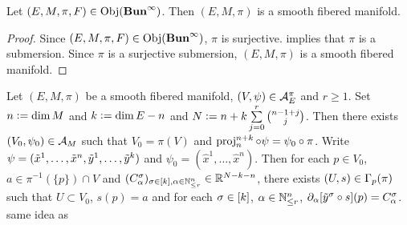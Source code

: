 \documentclass{book}
\begin{document}
\begin{ex} 
	Let $(E, M, \pi, F) \in \operatorname{Obj}(\operatorname*{\text{\textbf{Bun}}^{\infty}})$. Then $(E, M, \pi)$ is a smooth fibered manifold. 
\end{ex}

\begin{proof}
	Since $(E, M, \pi, F) \in \operatorname{Obj}(\operatorname*{\text{\textbf{Bun}}^{\infty}})$, $\pi$ is surjective.  implies that $\pi$ is a submersion. Since $\pi$ is a surjective submersion, $(E, M, \pi)$ is a smooth fibered manifold.
\end{proof}

\begin{ex} 
	Let $(E, M, \pi)$ be a smooth fibered manifold, $(V, \psi) \in \mathcal{A}_E^{\pi}$ and $r \geq 1$. Set $n \vcentcolon= \dim M$ and $k \vcentcolon= \dim E - n$ and $N \vcentcolon= n  + k \sum\limits_{j=0}^r {n-1 + j \choose j}$. Then there exists $(V_0, \psi_0) \in \mathcal{A}_M$ such that $V_0 = \pi(V)$ and $\operatorname{\text{proj}}^{n+k}_{n} \circ \psi = \psi_0 \circ \pi$. Write $\psi = (\tilde{x}^1, \ldots, \tilde{x}^n, \tilde{y}^1, \ldots, \tilde{y}^k)$ and $\psi_0 = (\hat{x}^1, \ldots, \hat{x}^n)$. Then for each $p \in V_0$, $a \in \pi^{-1}(\{p\}) \cap V$ and $(C^{\sigma}_{\alpha})_{\sigma \in [k], \alpha \in \mathbb{N}^n_{\leq r}} \in \mathbb{R}^{N-k-n}$, there exists $(U, s) \in \Gamma_p(\pi)$ such that $U \subset V_0$, $s(p) = a$ and for each $\sigma \in [k]$, $\alpha \in \mathbb{N}^n_{\leq r}$, $\partial_{\alpha}[\tilde{y}^{\sigma} \circ s](p) = C^{\sigma}_{\alpha}$. \\
	 same idea as  
\end{ex}
\end{document}
